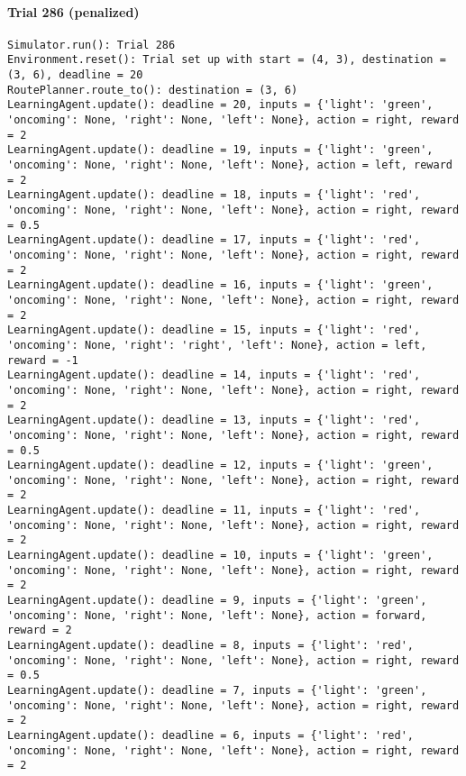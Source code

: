 \documentclass{article}
\begin{document}
\paragraph{Trial 286 (penalized)}\label{trial-286-penalized}

\begin{verbatim}
Simulator.run(): Trial 286
Environment.reset(): Trial set up with start = (4, 3), destination = (3, 6), deadline = 20
RoutePlanner.route_to(): destination = (3, 6)
LearningAgent.update(): deadline = 20, inputs = {'light': 'green', 'oncoming': None, 'right': None, 'left': None}, action = right, reward = 2
LearningAgent.update(): deadline = 19, inputs = {'light': 'green', 'oncoming': None, 'right': None, 'left': None}, action = left, reward = 2
LearningAgent.update(): deadline = 18, inputs = {'light': 'red', 'oncoming': None, 'right': None, 'left': None}, action = right, reward = 0.5
LearningAgent.update(): deadline = 17, inputs = {'light': 'red', 'oncoming': None, 'right': None, 'left': None}, action = right, reward = 2
LearningAgent.update(): deadline = 16, inputs = {'light': 'green', 'oncoming': None, 'right': None, 'left': None}, action = right, reward = 2
LearningAgent.update(): deadline = 15, inputs = {'light': 'red', 'oncoming': None, 'right': 'right', 'left': None}, action = left, reward = -1
LearningAgent.update(): deadline = 14, inputs = {'light': 'red', 'oncoming': None, 'right': None, 'left': None}, action = right, reward = 2
LearningAgent.update(): deadline = 13, inputs = {'light': 'red', 'oncoming': None, 'right': None, 'left': None}, action = right, reward = 0.5
LearningAgent.update(): deadline = 12, inputs = {'light': 'green', 'oncoming': None, 'right': None, 'left': None}, action = right, reward = 2
LearningAgent.update(): deadline = 11, inputs = {'light': 'red', 'oncoming': None, 'right': None, 'left': None}, action = right, reward = 2
LearningAgent.update(): deadline = 10, inputs = {'light': 'green', 'oncoming': None, 'right': None, 'left': None}, action = right, reward = 2
LearningAgent.update(): deadline = 9, inputs = {'light': 'green', 'oncoming': None, 'right': None, 'left': None}, action = forward, reward = 2
LearningAgent.update(): deadline = 8, inputs = {'light': 'red', 'oncoming': None, 'right': None, 'left': None}, action = right, reward = 0.5
LearningAgent.update(): deadline = 7, inputs = {'light': 'green', 'oncoming': None, 'right': None, 'left': None}, action = right, reward = 2
LearningAgent.update(): deadline = 6, inputs = {'light': 'red', 'oncoming': None, 'right': None, 'left': None}, action = right, reward = 2

\end{verbatim}
\end{document}
